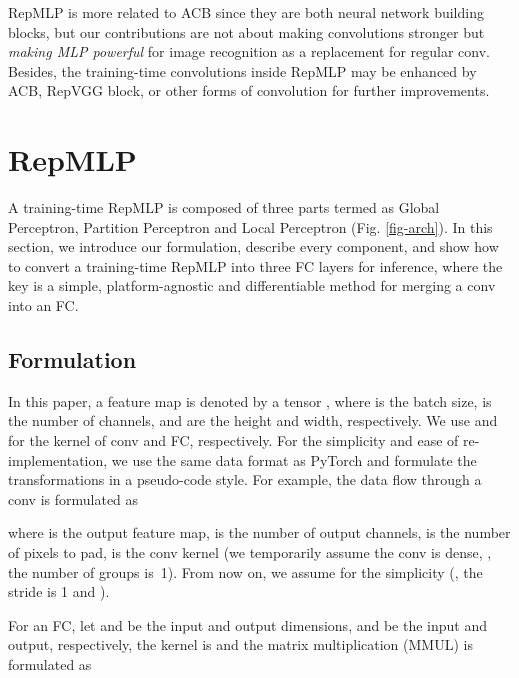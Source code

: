 \documentclass[10pt,twocolumn,letterpaper]{article}
\begin{document}
RepMLP is more related to ACB since they are both neural network building blocks, but our contributions are not about making convolutions stronger but \textit{making MLP powerful} for image recognition as a replacement for regular conv. Besides, the training-time convolutions inside RepMLP may be enhanced by ACB, RepVGG block, or other forms of convolution for further improvements.




















\section{RepMLP}






A training-time RepMLP is composed of three parts termed as Global Perceptron, Partition Perceptron and Local Perceptron (Fig. \ref{fig-arch}). In this section, we introduce our formulation, describe every component, and show how to convert a training-time RepMLP into three FC layers for inference, where the key is a simple, platform-agnostic and differentiable method for merging a conv into an FC.

\subsection{Formulation}

In this paper, a feature map is denoted by a tensor , where  is the batch size,  is the number of channels,  and  are the height and width, respectively. We use  and  for the kernel of conv and FC, respectively. For the simplicity and ease of re-implementation, we use the same data format as PyTorch \cite{paszke2019pytorch} and formulate the transformations in a pseudo-code style. For example, the data flow through a  conv is formulated as

where  is the output feature map,  is the number of output channels,  is the number of pixels to pad,  is the conv kernel (we temporarily assume the conv is dense, \ie, the number of groups is~1). From now on, we assume  for the simplicity (\ie, the stride is 1 and ).

For an FC, let  and  be the input and output dimensions,  and  be the input and output, respectively, the kernel is  and the matrix multiplication (MMUL) is formulated as 
\end{document}
